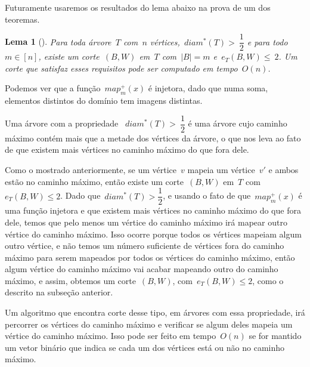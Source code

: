 \documentclass[a4paper,12pt]{article}
\newtheorem{lem}{Lema}
\begin{document}
	Futuramente usaremos os resultados do lema abaixo na prova de 
	um dos teoremas.

	\begin{lem}[{\cite[Lemma 5]{Schmidt15}}]
	\label{lema:caminhoLongo}
		Para toda árvore~$T$ com~$n$ 
		vértices,~$diam^*(T)>~\dfrac{1}{2}$
		e para todo~$m\in[n]$, existe um corte~$(B,W)$ em~$T$
		com~$|B|=m$ e~$e_T(B,W)\le~2$. Um corte que satisfaz esses
		requisitos pode ser computado em tempo~$O(n)$.
	\end{lem}

	\medskip
	\medskip

	Podemos ver que a função~$map^+_m(x)$ é injetora, dado que numa
	soma, elementos distintos do domínio tem imagens distintas.

	Uma árvore com a propriedade ~$diam^*(T)>~\dfrac{1}{2}$ é uma
	árvore cujo caminho máximo contém mais que a metade dos 
	vértices da árvore, o que nos leva ao fato de que existem mais 
	vértices no caminho máximo do que fora dele. 

	Como o mostrado anteriormente, se um vértice~$v$ mapeia um
	vértice~$v'$ e ambos estão no caminho máximo, então existe um
	corte~$(B,W)$ em~$T$ com~$e_T(B,W)\le 2$.
	Dado que~$diam^*(T)>\dfrac{1}{2}$, e usando o fato de 
	que~$map^+_m(x)$ é uma função injetora e que
	existem mais vértices no caminho máximo do que fora dele,
	temos que pelo menos um vértice do caminho máximo irá mapear
	outro vértice do caminho máximo. Isso ocorre porque todos
	os vértices mapeiam algum outro vértice, e não temos um 
	número suficiente de vértices fora do caminho máximo para serem
	mapeados por todos os vértices do caminho máximo, então algum
	vértice do caminho máximo vai acabar mapeando outro do caminho
	máximo, e assim, obtemos um corte~$(B,W)$, com~$e_T(B,W)\le 2$,
	como o descrito na subseção anterior.

	Um algoritmo que encontra corte desse tipo, em árvores com 
	essa propriedade, irá percorrer os vértices do caminho máximo
	e verificar se algum deles mapeia um vértice do caminho máximo.
	Isso pode ser feito em tempo~$O(n)$ se for mantido um vetor 
	binário que indica se cada um dos vértices está ou não no
	caminho máximo.




\newpage
\end{document}
